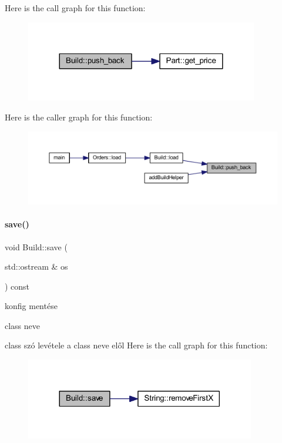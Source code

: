 Here is the call graph for this function\+:
\nopagebreak
\begin{figure}[H]
\begin{center}
\leavevmode
\includegraphics[width=288pt]{class_build_aba0548391a8c613ed2a9d81d4d3b2a4b_cgraph}
\end{center}
\end{figure}
Here is the caller graph for this function\+:
\nopagebreak
\begin{figure}[H]
\begin{center}
\leavevmode
\includegraphics[width=350pt]{class_build_aba0548391a8c613ed2a9d81d4d3b2a4b_icgraph}
\end{center}
\end{figure}
\mbox{\label{class_build_a954cd881cec1bf789fb57d7cdf617367}} 
\paragraph{\texorpdfstring{save()}{save()}}
{\footnotesize\ttfamily void Build\+::save (\begin{DoxyParamCaption}\item[{std\+::ostream \&}]{os }\end{DoxyParamCaption}) const}



konfig mentése 

class neve

class szó levétele a class neve elől Here is the call graph for this function\+:
\nopagebreak
\begin{figure}[H]
\begin{center}
\leavevmode
\includegraphics[width=284pt]{class_build_a954cd881cec1bf789fb57d7cdf617367_cgraph}
\end{center}
\end{figure}



